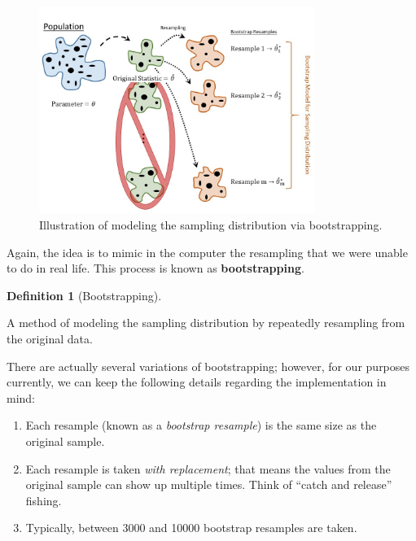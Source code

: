 \documentclass[
  letterpaper,
  DIV=11,
  numbers=noendperiod]{scrreprt}
\providecommand{\tightlist}{%
  \setlength{\itemsep}{0pt}\setlength{\parskip}{0pt}}\usepackage{longtable,booktabs,array}
\theoremstyle{definition}
\newtheorem{definition}{Definition}[chapter]
\theoremstyle{definition}
\theoremstyle{plain}
\theoremstyle{remark}
\begin{document}
\begin{figure}

{\centering \includegraphics[width=0.8\textwidth,height=\textheight]{./images/SamplingDistns-Bootstrap.jpg}

}

\caption{\label{fig-samplingdistns-bootstrap}Illustration of modeling
the sampling distribution via bootstrapping.}

\end{figure}

Again, the idea is to mimic in the computer the resampling that we were
unable to do in real life. This process is known as
\textbf{bootstrapping}.

\begin{definition}[Bootstrapping]\protect\hypertarget{def-bootstrap}{}\label{def-bootstrap}

A method of modeling the sampling distribution by repeatedly resampling
from the original data.

\end{definition}

There are actually several variations of bootstrapping; however, for our
purposes currently, we can keep the following details regarding the
implementation in mind:

\begin{enumerate}
\def\labelenumi{\arabic{enumi}.}
\tightlist
\item
  Each resample (known as a \emph{bootstrap resample}) is the same size
  as the original sample.
\item
  Each resample is taken \emph{with replacement}; that means the values
  from the original sample can show up multiple times. Think of ``catch
  and release'' fishing.
\item
  Typically, between 3000 and 10000 bootstrap resamples are taken.
\end{enumerate}
\end{document}
